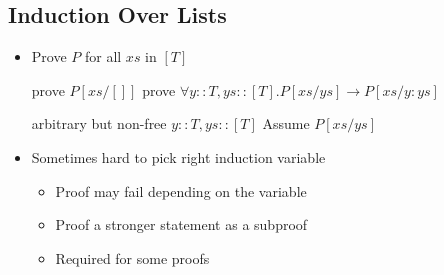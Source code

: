 \subsection{Induction Over Lists}
\begin{itemize}
    \item Prove $P$ for all $xs$ in $[T]$
        \begin{itemize}
             prove $P[xs/[]]$
             prove $\forall y :: T, ys :: [T]. P[xs/ys] \to P[xs/y:ys]$
                \begin{itemize}
                     arbitrary but non-free $y :: T, ys :: [T]$
                     Assume $P[xs/ys]$
                \end{itemize}
        \end{itemize}
    \item Sometimes hard to pick right induction variable
        \begin{itemize}
            \item Proof may fail depending on the variable
        \end{itemize}
        \begin{itemize}
            \item Proof a stronger statement as a subproof
            \item Required for some proofs
        \end{itemize}
\end{itemize}
